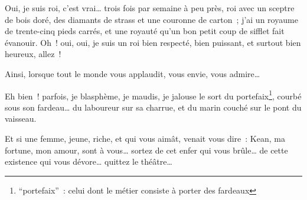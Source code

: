 {

\vspace*{-18pt}

Oui, je suis roi, c'est vrai… trois fois par semaine à peu près, roi
avec un sceptre de bois doré, des diamants de strass et une couronne
de carton~; j'ai un royaume de trente-cinq pieds carrés, et une
royauté qu'un bon petit coup de sifflet fait évanouir. Oh~! oui, oui,
je suis un roi bien respecté, bien puissant, et surtout bien heureux,
allez~!


Ainsi, lorsque tout le monde vous applaudit, vous envie, vous admire…


Eh bien~! parfois, je blasphème, je maudis, je jalouse le sort du
portefaix\footnote{“portefaix”~: celui dont le métier consiste à
porter des fardeaux}, courbé sous son fardeau… du laboureur sur sa
charrue, et du marin couché sur le pont du vaisseau.


Et si une femme, jeune, riche, et qui vous aimât, venait vous dire~:
Kean, ma fortune, mon amour, sont à vous… sortez de cet enfer qui
vous brûle… de cette existence qui vous dévore… quittez le théâtre…


}
